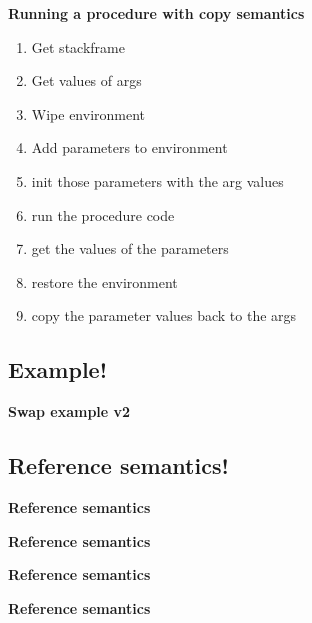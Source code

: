\begin{frame}{\textbf{Running a procedure with copy semantics}}
    
    \begin{enumerate}[<+->]
        \item Get stackframe
        \item Get values of args
        \item Wipe environment
        \item Add parameters to environment
        \item init those parameters with the arg values
        \item run the procedure code
        \item get the values of the parameters
        \item restore the environment
        \item copy the parameter values back to the args
    \end{enumerate}
\end{frame}


\subsection*{Example!}
\begin{frame}{\textbf{Swap example v2}}
    
\end{frame}

\subsection*{Reference semantics!}
\begin{frame}\textbf{{Reference semantics}}
    
\end{frame}

\begin{frame}\textbf{{Reference semantics}}
    
\end{frame}
\begin{frame}\textbf{{Reference semantics}}
    
\end{frame}
\begin{frame}\textbf{{Reference semantics}}
    
\end{frame}


